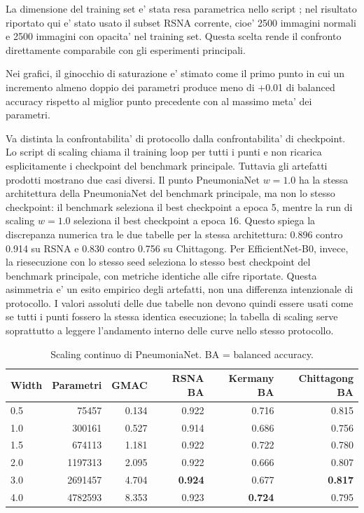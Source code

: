 \documentclass[11pt,a4paper]{article}
\newcommand{\balacc}{balanced accuracy}
\begin{document}
La dimensione del training set e' stata resa parametrica nello script
; nel risultato riportato qui e' stato usato
il subset RSNA corrente, cioe' 2500 immagini normali e 2500 immagini con
opacita' nel training set. Questa scelta rende il confronto direttamente
comparabile con gli esperimenti principali.

Nei grafici, il ginocchio di saturazione e' stimato come il primo punto in cui
un incremento almeno doppio dei parametri produce meno di +0.01 di \balacc{}
rispetto al miglior punto precedente con al massimo meta' dei parametri.

Va distinta la confrontabilita' di protocollo dalla confrontabilita' di
checkpoint. Lo script di scaling chiama il training loop per tutti i punti e non
ricarica esplicitamente i checkpoint del benchmark principale. Tuttavia gli
artefatti prodotti mostrano due casi diversi. Il punto PneumoniaNet \(w=1.0\)
ha la stessa architettura della PneumoniaNet del benchmark principale, ma non lo
stesso checkpoint: il benchmark seleziona il best checkpoint a epoca 5, mentre
la run di scaling \(w=1.0\) seleziona il best checkpoint a epoca 16. Questo
spiega la discrepanza numerica tra le due tabelle per la stessa architettura:
0.896 contro 0.914 su RSNA e 0.830 contro 0.756 su Chittagong. Per
EfficientNet-B0, invece, la riesecuzione con lo stesso seed seleziona lo stesso
best checkpoint del benchmark principale, con metriche identiche alle cifre
riportate. Questa asimmetria e' un esito empirico degli artefatti, non una
differenza intenzionale di protocollo. I valori assoluti delle due tabelle non
devono quindi essere usati come se tutti i punti fossero la stessa identica
esecuzione; la tabella di scaling serve soprattutto a leggere l'andamento
interno delle curve nello stesso protocollo.

\begin{table}[H]
\centering
\caption{Scaling continuo di PneumoniaNet. BA = balanced accuracy.}
\small
\begin{tabular}{lrrrrr}
\toprule
Width & Parametri & GMAC & RSNA BA & Kermany BA & Chittagong BA \\
\midrule
0.5 & 75457 & 0.134 & 0.922 & 0.716 & 0.815 \\
1.0 & 300161 & 0.527 & 0.914 & 0.686 & 0.756 \\
1.5 & 674113 & 1.181 & 0.922 & 0.722 & 0.780 \\
2.0 & 1197313 & 2.095 & 0.922 & 0.666 & 0.807 \\
3.0 & 2691457 & 4.704 & \textbf{0.924} & 0.677 & \textbf{0.817} \\
4.0 & 4782593 & 8.353 & 0.923 & \textbf{0.724} & 0.795 \\
\bottomrule
\end{tabular}
\normalsize
\end{table}
\end{document}
